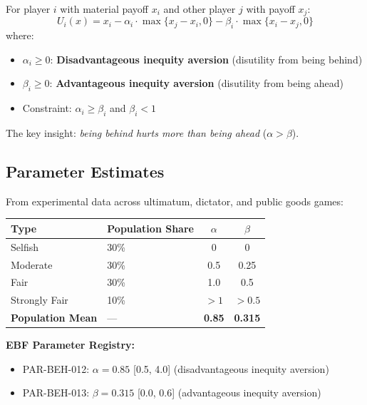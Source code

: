 \begin{definition}
\label{def:fehr-schmidt}
For player $i$ with material payoff $x_i$ and other player $j$ with payoff $x_j$:
\begin{equation}
U_i(x) = x_i - \alpha_i \cdot \max\{x_j - x_i, 0\} - \beta_i \cdot \max\{x_i - x_j, 0\}
\end{equation}
where:
\begin{itemize}[nosep]
    \item $\alpha_i \geq 0$: \textbf{Disadvantageous inequity aversion} (disutility from being behind)
    \item $\beta_i \geq 0$: \textbf{Advantageous inequity aversion} (disutility from being ahead)
    \item Constraint: $\alpha_i \geq \beta_i$ and $\beta_i < 1$
\end{itemize}
\end{definition}

The key insight: \textit{being behind hurts more than being ahead} ($\alpha > \beta$).

\subsection{Parameter Estimates}

From experimental data across ultimatum, dictator, and public goods games:

\begin{center}
\renewcommand{\arraystretch}{1.3}
\begin{tabular}{llcc}
\hline
\textbf{Type} & \textbf{Population Share} & $\alpha$ & $\beta$ \\
\hline
Selfish & 30\% & 0 & 0 \\
Moderate & 30\% & 0.5 & 0.25 \\
Fair & 30\% & 1.0 & 0.5 \\
Strongly Fair & 10\% & $>1$ & $>0.5$ \\
\hline
\textbf{Population Mean} & --- & \textbf{0.85} & \textbf{0.315} \\
\hline
\end{tabular}
\end{center}

\textbf{EBF Parameter Registry:}
\begin{itemize}[nosep]
    \item PAR-BEH-012: $\alpha = 0.85$ [0.5, 4.0] (disadvantageous inequity aversion)
    \item PAR-BEH-013: $\beta = 0.315$ [0.0, 0.6] (advantageous inequity aversion)
\end{itemize}

